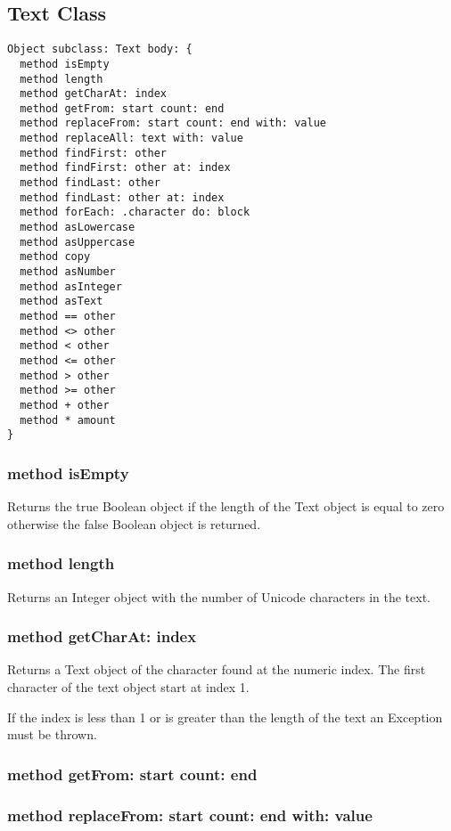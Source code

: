\subsection {Text Class}

\begin{lstlisting}
Object subclass: Text body: {
  method isEmpty
  method length
  method getCharAt: index
  method getFrom: start count: end
  method replaceFrom: start count: end with: value
  method replaceAll: text with: value
  method findFirst: other
  method findFirst: other at: index
  method findLast: other
  method findLast: other at: index
  method forEach: .character do: block
  method asLowercase
  method asUppercase
  method copy
  method asNumber
  method asInteger
  method asText
  method == other
  method <> other
  method < other
  method <= other
  method > other
  method >= other
  method + other
  method * amount
}
\end{lstlisting}

\subsubsection{method isEmpty}
Returns the true Boolean object if the length of the Text object is equal to zero otherwise the false Boolean object is returned.

\subsubsection{method length}
Returns an Integer object with the number of Unicode characters in the text.

\subsubsection{method getCharAt: index}
Returns a Text object of the character found at the numeric index. The first character of the text object start at index 1.

If the index is less than 1 or is greater than the length of the text an Exception must be thrown.

\subsubsection{method getFrom: start count: end}

\subsubsection{method replaceFrom: start count: end with: value}

